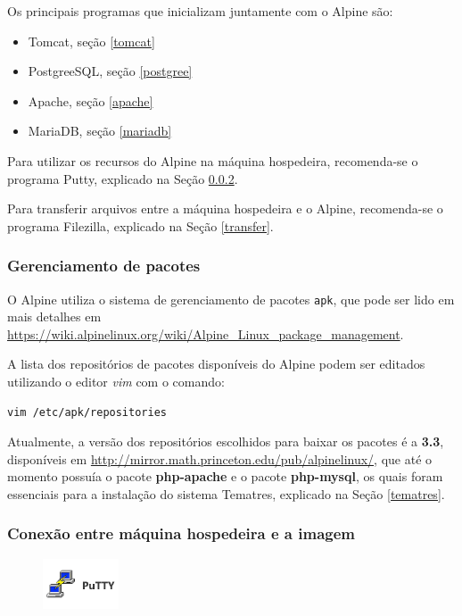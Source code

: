 Os principais programas que inicializam juntamente com o Alpine são:

\begin{itemize}
    \item Tomcat, seção \ref{tomcat}
    \item PostgreeSQL, seção \ref{postgree}
    \item Apache, seção \ref{apache}
    \item MariaDB, seção \ref{mariadb}
\end{itemize}

Para utilizar os recursos do Alpine na máquina hospedeira, recomenda-se o programa Putty, explicado na Seção \ref{conexao}.

Para transferir arquivos entre a máquina hospedeira e o Alpine, recomenda-se o programa Filezilla, explicado na Seção \ref{transfer}.

\subsubsection{Gerenciamento de pacotes}

O Alpine utiliza o sistema de gerenciamento de pacotes \lstinline{apk}, que pode ser lido em mais detalhes em \url{https://wiki.alpinelinux.org/wiki/Alpine_Linux_package_management}.

A lista dos repositórios de pacotes disponíveis do Alpine podem ser editados utilizando o editor \textit{vim} com o comando:

\begin{lstlisting}[language=bash]
    vim /etc/apk/repositories
\end{lstlisting}

Atualmente, a versão dos repositórios escolhidos para baixar os pacotes é a \textbf{3.3}, disponíveis em \url{http://mirror.math.princeton.edu/pub/alpinelinux/}, que até o momento possuía o pacote \textbf{php-apache} e o pacote \textbf{php-mysql}, os quais foram essenciais para a instalação do sistema Tematres, explicado na Seção \ref{tematres}.

\subsubsection{Conexão entre máquina hospedeira e a imagem}\label{conexao}

\begin{figure} %
    \centering
    \includegraphics[width=0.2\textwidth]{../images/putty1.png}
\end{figure}

